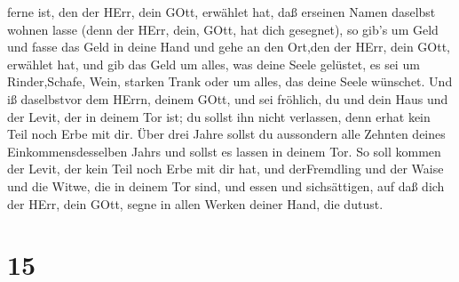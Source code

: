 ferne ist, den der HErr, dein GOtt, erwählet hat, daß erseinen Namen
daselbst wohnen lasse (denn der HErr, dein, GOtt, hat dich gesegnet),
 so gib's um Geld und fasse das Geld in deine Hand und gehe
an den Ort,den der HErr, dein GOtt, erwählet hat,  und gib
das Geld um alles, was deine Seele gelüstet, es sei um Rinder,Schafe,
Wein, starken Trank oder um alles, das deine Seele wünschet. Und iß
daselbstvor dem HErrn, deinem GOtt, und sei fröhlich, du und dein Haus
 und der Levit, der in deinem Tor ist; du sollst ihn nicht
verlassen, denn erhat kein Teil noch Erbe mit dir.  Über
drei Jahre sollst du aussondern alle Zehnten deines Einkommensdesselben
Jahrs und sollst es lassen in deinem Tor.  So soll kommen
der Levit, der kein Teil noch Erbe mit dir hat, und derFremdling und der
Waise und die Witwe, die in deinem Tor sind, und essen und sichsättigen,
auf daß dich der HErr, dein GOtt, segne in allen Werken deiner Hand, die
dutust.

\hypertarget{section-14}{%
\section{15}\label{section-14}}

